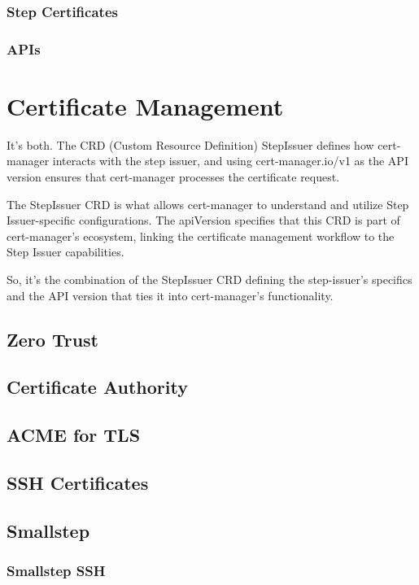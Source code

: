 \subsection{Step Certificates}

\subsection{APIs}

\chapter{Certificate Management}

It’s both. The CRD (Custom Resource Definition) StepIssuer defines how cert-manager interacts with the step issuer, and using cert-manager.io/v1 as the API version ensures that cert-manager processes the certificate request.

The StepIssuer CRD is what allows cert-manager to understand and utilize Step Issuer-specific configurations. The apiVersion specifies that this CRD is part of cert-manager’s ecosystem, linking the certificate management workflow to the Step Issuer capabilities.

So, it’s the combination of the StepIssuer CRD defining the step-issuer's specifics and the API version that ties it into cert-manager’s functionality.

\section{Zero Trust}

\section{Certificate Authority}

\section{ACME for TLS}

\section{SSH Certificates}

\section{Smallstep}

\subsection{Smallstep SSH}

